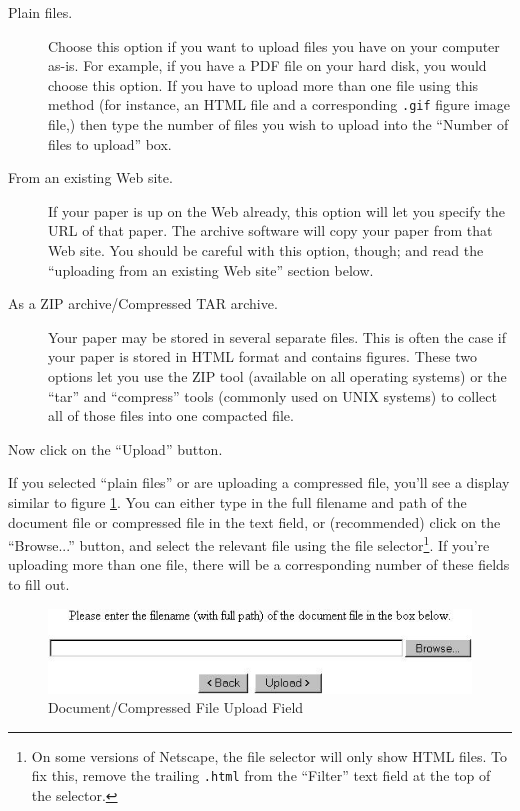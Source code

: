 \begin{description}
\item[Plain files.] Choose this option if you want to upload files you have on your computer as-is. For example, if you have a PDF file on your hard disk, you would choose this option. If you have to upload more than one file using this method (for instance, an HTML file and a corresponding {\tt .gif} figure image file,) then type the number of files you wish to upload into the ``Number of files to upload'' box.
\item[From an existing Web site.] If your paper is up on the Web already, this option will let you specify the URL of that paper. The archive software will copy your paper from that Web site. You should be careful with this option, though; and read the ``uploading from an existing Web site'' section below.
\item[As a ZIP archive/Compressed TAR archive.] Your paper may be stored in several separate files. This is often the case if your paper is stored in HTML format and contains figures. These two options let you use the ZIP tool (available on all operating systems) or the ``tar'' and ``compress'' tools (commonly used on UNIX systems) to collect all of those files into one compacted file.
\end{description}

Now click on the ``Upload'' button.

If you selected ``plain files'' or are uploading a compressed file, you'll see a display similar to figure \ref{plain_files}. You can either type in the full filename and path of the document file or compressed file in the text field, or (recommended) click on the ``Browse...'' button, and select the relevant file using the file selector\footnote{On some versions of Netscape, the file selector will only show HTML files. To fix this, remove the trailing {\tt .html} from the ``Filter'' text field at the top of the selector.}. If you're uploading more than one file, there will be a corresponding number of these fields to fill out.

\begin{figure}
\centerline{\includegraphics[width=4.5in]{images/plain-files}}
\caption{\label{plain_files} Document/Compressed File Upload Field}
\end{figure}

